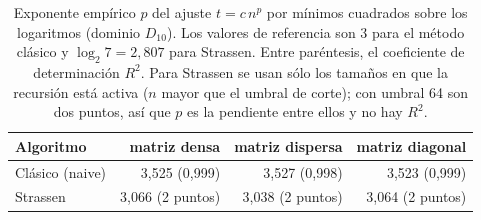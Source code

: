 %
\begin{table}[H]
\centering
\small
\caption{Exponente empírico $p$ del ajuste $t = c\,n^{p}$ por mínimos cuadrados sobre los logaritmos (dominio $D_{10}$). Los valores de referencia son $3$ para el método clásico y $\log_2 7 = 2{,}807$ para Strassen. Entre paréntesis, el coeficiente de determinación $R^2$. Para Strassen se usan sólo los tamaños en que la recursión está activa ($n$ mayor que el umbral de corte); con umbral 64 son dos puntos, así que $p$ es la pendiente entre ellos y no hay $R^2$.}
\label{tab:matrix-exponents}
\begin{tabular}{lrrr}
\hline\hline
Algoritmo & matriz densa & matriz dispersa & matriz diagonal \\
\hline
Clásico (naive) & 3{,}525 (0{,}999) & 3{,}527 (0{,}998) & 3{,}523 (0{,}999) \\
Strassen & 3{,}066 (2 puntos) & 3{,}038 (2 puntos) & 3{,}064 (2 puntos) \\
\hline\hline
\end{tabular}
\end{table}
